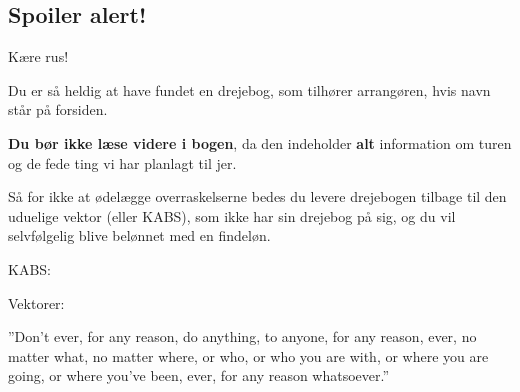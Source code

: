 \begin{center}
\section*{{\color{red} {\Huge Spoiler alert!}}}
\end{center}
{ \large
Kære rus!

Du er så heldig at have fundet en drejebog, som tilhører arrangøren, hvis navn står på forsiden.

\textbf{Du bør ikke læse videre i bogen}, da den indeholder \textbf{alt} information om turen og de fede ting vi har planlagt til jer. 

Så for ikke at ødelægge overraskelserne bedes du levere drejebogen tilbage til den uduelige vektor (eller KABS), som ikke har sin drejebog på sig, og du vil selvfølgelig blive belønnet med en findeløn.
}
\begin{center}

{\huge KABS:


\KABS

\KABSEKS
}

\vspace*{3em}

{\huge Vektorer: 


\VEKTOREKS
}

\end{center}
\vfill
\begin{center}
    {\large ''Don't ever, for any reason, do anything, to anyone, for any reason, ever, no matter what, no matter where, or who, or who you are with, or where you are going, or where you've been, ever, for any reason whatsoever.''}
\end{center}
\newpage